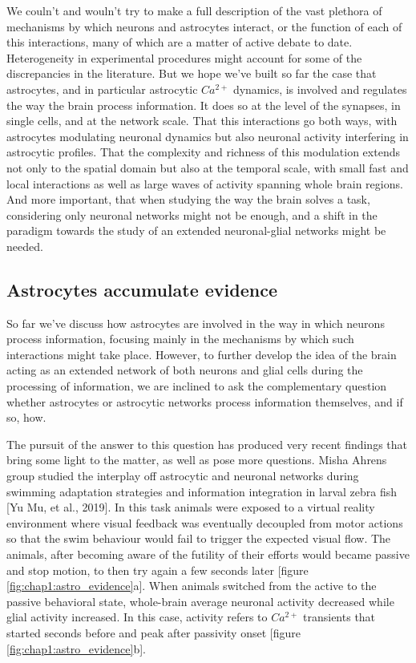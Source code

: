 We couln't and wouln't try to make a full description of the vast plethora of mechanisms by which neurons and astrocytes interact, or the function of each of this interactions, many of which are a matter of active debate to date. 
Heterogeneity in experimental procedures might account for some of the discrepancies in the literature.
But we hope we've built so far the case that astrocytes, and in particular astrocytic $Ca^{2+}$ dynamics, is involved and regulates the way the brain process information.
It does so at the level of the synapses, in single cells, and at the network scale.
That this interactions go both ways, with astrocytes modulating neuronal dynamics but also neuronal activity interfering in astrocytic profiles.
That the complexity and richness of this modulation extends not only to the spatial domain but also at the temporal scale, with small fast and local interactions as well as large waves of activity spanning whole brain regions.
And more important, that when studying the way the brain solves a task, considering only neuronal networks might not be enough, and a shift in the paradigm towards the study of an extended neuronal-glial networks might be needed. 

\subsection{Astrocytes accumulate evidence}
\label{chap1:sec:2:subsec4:astro_evidence}
So far we've discuss how astrocytes are involved in the way in which neurons process information, focusing mainly in the mechanisms by which such interactions might take place.
However, to further develop the idea of the brain acting as an extended network of both neurons and glial cells during the processing of information, we are inclined to ask the complementary question whether astrocytes or astrocytic networks process information themselves, and if so, how. 

The pursuit of the answer to this question has produced very recent findings that bring some light to the matter, as well as pose more questions. 
Misha Ahrens group studied the interplay off astrocytic and neuronal networks during swimming adaptation strategies and information integration in larval zebra fish [Yu Mu, et al., 2019]. 
In this task animals were exposed to a virtual reality environment where visual feedback was eventually decoupled from motor actions so that the swim behaviour would fail to trigger the expected visual flow. 
The animals, after becoming aware of the futility of their efforts would became passive and stop motion, to then try again a few seconds later [figure \ref{fig:chap1:astro_evidence}a]. 
When animals switched from the active to the passive behavioral state, whole-brain average neuronal activity decreased while glial activity increased. 
In this case, activity refers to $Ca^{2+}$ transients that started seconds before and peak after passivity onset [figure \ref{fig:chap1:astro_evidence}b]. 

